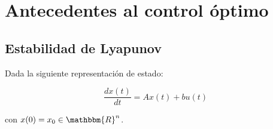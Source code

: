 \chapter{Antecedentes al control óptimo}

    \section{Estabilidad de Lyapunov}

        Dada la siguiente representación de estado:

        \begin{equation} \label{eq:lyap1}
            \frac{dx(t)}{dt} = A x(t) + b u(t)
        \end{equation}

        con $x(0) = x_0  \in \mathbbm{R}^n$.

